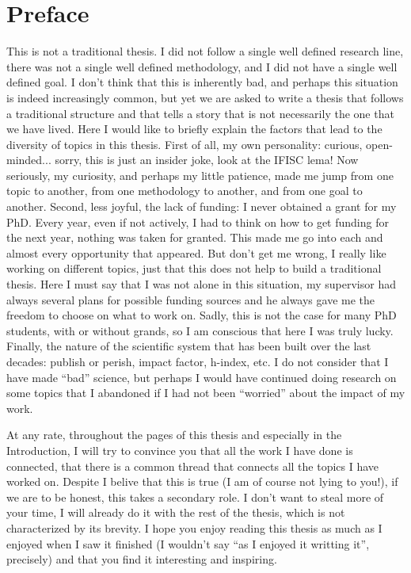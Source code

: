 \pagebreak
\thispagestyle{empty}
\section*{Preface}

This is not a traditional thesis. I did not follow a single well defined
research line, there was not a single well defined methodology, and I did not
have a single well defined goal. I don't think that this is inherently bad, and
perhaps this situation is indeed increasingly common, but yet we are asked to
write a thesis that follows a traditional structure and that tells a story that
is not necessarily the one that we have lived. Here I would like to briefly
explain the factors that lead to the diversity of topics in this thesis. First
of all, my own personality: curious, open-minded... sorry, this is just an
insider joke, look at the IFISC lema! Now seriously, my curiosity, and perhaps
my little patience, made me jump from one topic to another, from one
methodology to another, and from one goal to another. Second, less joyful,
the lack of funding: I never obtained a grant for my PhD. Every year, even if
not actively, I had to think on how to get funding for the next year, nothing
was taken for granted. This made me go into each and almost every opportunity
that appeared. But don't get me wrong, I really like working on different
topics, just that this does not help to build a traditional thesis. Here I must
say that I was not alone in this situation, my supervisor had always several
plans for possible funding sources and he always gave me the freedom to choose
on what to work on. Sadly, this is not the case for many PhD students, with or
without grands, so I am conscious that here I was truly lucky. Finally, the
nature of the scientific system that has been built over the last decades:
publish or perish, impact factor, h-index, etc. I do not consider that I
have made ``bad'' science, but perhaps I would have continued doing research on
some topics that I abandoned if I had not been ``worried'' about the impact of
my work.

At any rate, throughout the pages of this thesis and especially in the
Introduction, I will try to convince you that all the work I have done is
connected, that there is a common thread that connects all the topics I have
worked on. Despite I belive that this is true (I am of course not lying to
you!), if we are to be honest, this takes a secondary role. I don't want to
steal more of your time, I will already do it with the rest of the thesis,
which is not characterized by its brevity. I hope you enjoy reading this
thesis as much as I enjoyed when I saw it finished (I wouldn't say ``as I
enjoyed it writting it'', precisely) and that you find it interesting and
inspiring.

\vfill